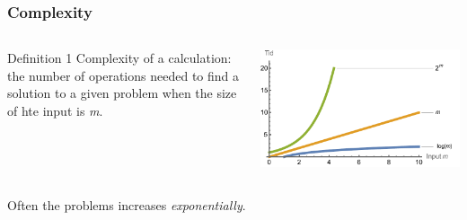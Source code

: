 \documentclass[10pt]{beamer}
\begin{document}
\begin{frame}
  \frametitle{Complexity}
  \begin{columns}
    \begin{column}{0.5\linewidth}
      \begin{block}{Definition 1}
       Complexity of a calculation: the number of operations needed to find a solution to a given problem when the size of hte input is \emph{m}. 
      \end{block}
    \end{column}
    \begin{column}{0.5\linewidth}

      \includegraphics[width=\linewidth]{img/Complexity.pdf}
    \end{column}
  \end{columns}
   \Large Often the problems increases \emph{exponentially}.
\end{frame}
\end{document}
